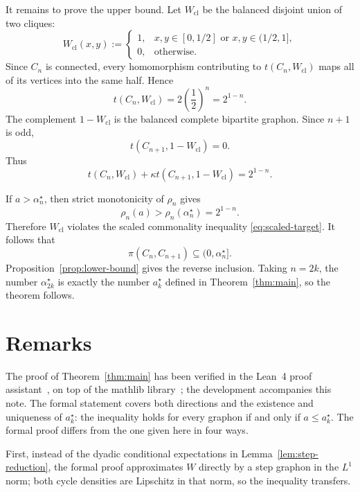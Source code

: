 \documentclass[11pt]{article}
\theoremstyle{definition}
\theoremstyle{remark}
\begin{document}
It remains to prove the upper bound.  Let $W_{\mathrm{cl}}$ be the
balanced disjoint union of two cliques:
\[
  W_{\mathrm{cl}}(x,y)
  :=
  \begin{cases}
    1,
    &x,y\in[0,1/2]
      \text{ or }x,y\in(1/2,1],\\
    0,&\text{otherwise}.
  \end{cases}
\]
Since $C_n$ is connected, every homomorphism contributing to
$t(C_n,W_{\mathrm{cl}})$ maps all of its vertices into the same half.  Hence
\begin{equation}
  t(C_n,W_{\mathrm{cl}})
  =2\left(\frac12\right)^n
  =2^{1-n}.
  \label{eq:two-clique-even-cycle}
\end{equation}
The complement $1-W_{\mathrm{cl}}$ is the balanced complete bipartite graphon.
Since $n+1$ is odd,
\begin{equation}
  t(C_{n+1},1-W_{\mathrm{cl}})=0.
  \label{eq:bipartite-odd-cycle}
\end{equation}
Thus
\begin{equation}
  t(C_n,W_{\mathrm{cl}})
  +\kappa t(C_{n+1},1-W_{\mathrm{cl}})
  =2^{1-n}.
  \label{eq:obstruction-value}
\end{equation}

If $a>\alpha_n^\star$, then strict monotonicity of $\rho_n$ gives
\[
  \rho_n(a)>\rho_n(\alpha_n^\star)=2^{1-n}.
\]
Therefore $W_{\mathrm{cl}}$ violates the scaled commonality inequality
\eqref{eq:scaled-target}.  It follows that
\[
  \pi(C_n,C_{n+1})\subseteq(0,\alpha_n^\star].
\]
Proposition~\ref{prop:lower-bound} gives the reverse inclusion.  Taking
$n=2k$, the number $\alpha_{2k}^\star$ is exactly the number
$a_k^\star$ defined in Theorem~\ref{thm:main}, so the theorem follows.

\section{Remarks}

The proof of Theorem~\ref{thm:main} has been verified in the Lean~4
proof assistant~\cite{Lean4}, on top of the mathlib
library~\cite{mathlib}; the development accompanies this note.  The
formal statement covers both directions and the existence and
uniqueness of $a_k^\star$: the inequality holds for every graphon if
and only if $a\le a_k^\star$.  The formal proof differs from the one
given here in four ways.

First, instead of the dyadic conditional expectations in
Lemma~\ref{lem:step-reduction}, the formal proof approximates $W$
directly by a step graphon in the $L^1$ norm; both cycle densities
are Lipschitz in that norm, so the inequality transfers.
\end{document}

